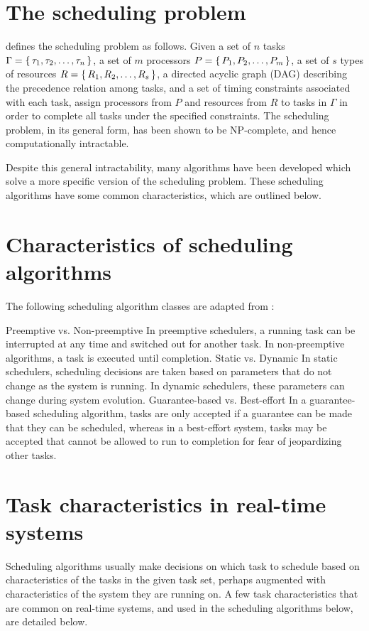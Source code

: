 \documentclass[twoside]{uva-inf-bachelor-thesis}
\begin{document}
\section{The scheduling problem}
\textcite{buttazzo2011hard} defines the scheduling problem as follows. Given a set of $n$ tasks $\Gamma = \set{\tau_1, \tau_2, \ldots, \tau_n}$, a set of $m$ processors $P = \set{P_1, P_2, \ldots, P_m}$, a set of $s$ types of resources $R = \set{R_1, R_2, \ldots, R_s}$, a directed acyclic graph (DAG) describing the precedence relation among tasks, and a set of timing constraints associated with each task, assign processors from $P$ and resources from $R$ to tasks in $\Gamma$ in order to complete all tasks under the specified constraints. The scheduling problem, in its general form, has been shown to be NP-complete, and hence computationally intractable.

Despite this general intractability, many algorithms have been developed which solve a more specific version of the scheduling problem. These scheduling algorithms have some common characteristics, which are outlined below.

\section{Characteristics of scheduling algorithms}
The following scheduling algorithm classes are adapted from \textcite{buttazzo2011hard}:
\begin{outline}
    \1 Preemptive vs. Non-preemptive
        \2 In preemptive schedulers, a running task can be interrupted at any time and switched out for another task.
        \2 In non-preemptive algorithms, a task is executed until completion.
    \1 Static vs. Dynamic
        \2 In static schedulers, scheduling decisions are taken based on parameters that do not change as the system is running. In dynamic schedulers, these parameters can change during system evolution.
    \1 Guarantee-based vs. Best-effort
        \2 In a guarantee-based scheduling algorithm, tasks are only accepted if a guarantee can be made that they can be scheduled, whereas in a best-effort system, tasks may be accepted that cannot be allowed to run to completion for fear of jeopardizing other tasks.
\end{outline}

\section{Task characteristics in real-time systems}
Scheduling algorithms usually make decisions on which task to schedule based on characteristics of the tasks in the given task set, perhaps augmented with characteristics of the system they are running on. A few task characteristics that are common on real-time systems, and used in the scheduling algorithms below, are detailed below.
\end{document}
